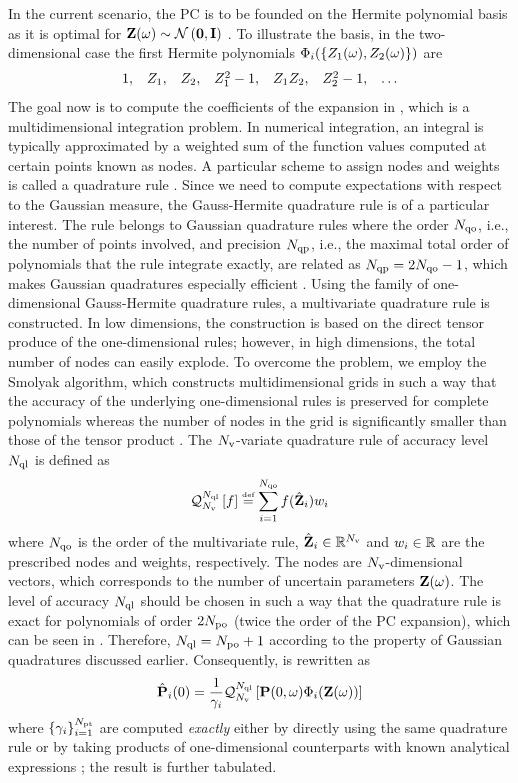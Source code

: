 In the current scenario, the PC is to be founded on the Hermite polynomial basis as it is optimal for $\vZ(\o) \sim \normal{\vZero}{\mI}$ \cite{xiu2002}. To illustrate the basis, in the two-dimensional case the first Hermite polynomials $\Phi_i(\{ Z_1(\omega), Z_2(\omega) \})$ are
\[
  \begin{array}{lllllll}
  1, & Z_1, & Z_2, & Z_1^2 - 1, & Z_1 Z_2, & Z_2^2 - 1, & \dotsc
  \end{array}
\]
The goal now is to compute the coefficients of the expansion in , which is a multidimensional integration problem. In numerical integration, an integral is typically approximated by a weighted sum of the function values computed at certain points known as nodes. A particular scheme to assign nodes and weights is called a quadrature rule \cite{press2007}. Since we need to compute expectations with respect to the Gaussian measure, the Gauss-Hermite quadrature rule is of a particular interest. The rule belongs to Gaussian quadrature rules where the order $N_\text{qo}$, i.e., the number of points involved, and precision $N_\text{qp}$, i.e., the maximal total order of polynomials that the rule integrate exactly, are related as $N_\text{qp} = 2 N_\text{qo} - 1$, which makes Gaussian quadratures especially efficient \cite{heiss2008}. Using the family of one-dimensional Gauss-Hermite quadrature rules, a multivariate quadrature rule is constructed. In low dimensions, the construction is based on the direct tensor produce of the one-dimensional rules; however, in high dimensions, the total number of nodes can easily explode. To overcome the problem, we employ the Smolyak algorithm, which constructs multidimensional grids in such a way that the accuracy of the underlying one-dimensional rules is preserved for complete polynomials whereas the number of nodes in the grid is significantly smaller than those of the tensor product \cite{eldred2009, maitre2010, heiss2008}. The ${N_\text{v}}$-variate quadrature rule of accuracy level $N_\text{ql}$ is defined as
\[
  \mathcal{Q}_{{N_\text{v}}}^{N_\text{ql}}\left[f\right] \stackrel{\text{\tiny def}}{=} \sum_{i = 1}^{N_\text{qo}} f(\hat{\mathbf{Z}}_i) w_i
\]
where $N_\text{qo}$ is the order of the multivariate rule, $\hat{\mathbf{Z}}_i \in \mathbb{R}^{N_\text{v}}$ and $w_i \in \mathbb{R}$ are the prescribed nodes and weights, respectively. The nodes are ${N_\text{v}}$-dimensional vectors, which corresponds to the number of uncertain parameters $\mathbf{Z}(\omega)$. The level of accuracy $N_\text{ql}$ should be chosen in such a way that the quadrature rule is exact for polynomials of order $2 {N_\text{po}}$ (twice the order of the PC expansion), which can be seen in . Therefore, $N_\text{ql} = {N_\text{po}} + 1$ according to the property of Gaussian quadratures discussed earlier. Consequently,  is rewritten as
\[
  \hat{\mathbf{P}}_i(0) = \frac{1}{\gamma_i} \mathcal{Q}_{{N_\text{v}}}^{N_\text{ql}}\left[\mathbf{P}(0, \omega) \Phi_i(\mathbf{Z}(\omega))\right]
\]
where $\{ \gamma_i \}_{i = 1}^{{N_\text{pt}}}$ are computed \emph{exactly} either by directly using the same quadrature rule or by taking products of one-dimensional counterparts with known analytical expressions \cite{xiu2010}; the result is further tabulated.
